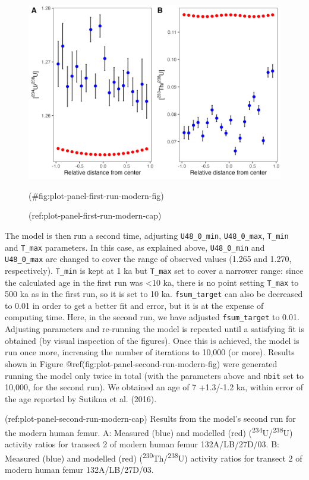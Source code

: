 \documentclass[]{elsarticle} %
\begin{document}
\begin{figure}
\includegraphics[width=0.95\linewidth]{figures/plot-panel-first-run-modern} \caption{(ref:plot-panel-first-run-modern-cap)}(\#fig:plot-panel-first-run-modern-fig)
\end{figure}

\FloatBarrier

The model is then run a second time, adjusting \texttt{U48\_0\_min}, \texttt{U48\_0\_max}, \texttt{T\_min} and \texttt{T\_max} parameters. In this case, as explained above, \texttt{U48\_0\_min} and \texttt{U48\_0\_max} are changed to cover the range of observed values (1.265 and 1.270, respectively). \texttt{T\_min} is kept at 1 ka but \texttt{T\_max} set to cover a narrower range: since the calculated age in the first run was \textless10 ka, there is no point setting \texttt{T\_max} to 500 ka as in the first run, so it is set to 10 ka. \texttt{fsum\_target} can also be decreased to 0.01 in order to get a better fit and error, but it is at the expense of computing time. Here, in the second run, we have adjusted \texttt{fsum\_target} to 0.01.
Adjusting parameters and re-running the model is repeated until a satisfying fit is obtained (by visual inspection of the figures). Once this is achieved, the model is run once more, increasing the number of iterations to 10,000 (or more). Results shown in Figure @ref(fig:plot-panel-second-run-modern-fig) were generated running the model only twice in total (with the parameters above and \texttt{nbit} set to 10,000, for the second run). We obtained an age of 7 +1.3/-1.2 ka, within error of the age reported by Sutikna et al. (2016).

(ref:plot-panel-second-run-modern-cap) Results from the model's second run for the modern human femur. A: Measured (blue) and modelled (red) (\textsuperscript{234}U/\textsuperscript{238}U) activity ratios for transect 2 of modern human femur 132A/LB/27D/03. B: Measured (blue) and modelled (red) (\textsuperscript{230}Th/\textsuperscript{238}U) activity ratios for transect 2 of modern human femur 132A/LB/27D/03.
\end{document}
